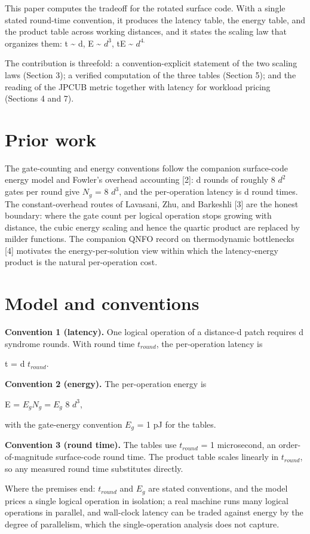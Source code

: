 \documentclass[11pt]{article}
\begin{document}
This paper computes the tradeoff for the rotated surface code. With a single stated round-time convention, it produces the latency table, the energy table, and the product table across working distances, and it states the scaling law that organizes them: t \textasciitilde{} d, E \textasciitilde{} $d^{3}$, tE \textasciitilde{} $d^{4.}$

The contribution is threefold: a convention-explicit statement of the two scaling laws (Section 3); a verified computation of the three tables (Section 5); and the reading of the JPCUB metric together with latency for workload pricing (Sections 4 and 7).

\section{Prior work}
The gate-counting and energy conventions follow the companion surface-code energy model and Fowler's overhead accounting [2]: d rounds of roughly 8 $d^{2}$ gates per round give $N_{g}$ = 8 $d^{3}$, and the per-operation latency is d round times. The constant-overhead routes of Lavasani, Zhu, and Barkeshli [3] are the honest boundary: where the gate count per logical operation stops growing with distance, the cubic energy scaling and hence the quartic product are replaced by milder functions. The companion QNFO record on thermodynamic bottlenecks [4] motivates the energy-per-solution view within which the latency-energy product is the natural per-operation cost.

\section{Model and conventions}
\textbf{Convention 1 (latency).} One logical operation of a distance-d patch requires d syndrome rounds. With round time $t_{round}$, the per-operation latency is

t = d $t_{round}$.

\textbf{Convention 2 (energy).} The per-operation energy is

E = $E_{g}   N_{g} = E_{g}$ 8 $d^{3}$,

with the gate-energy convention $E_{g}$ = 1 pJ for the tables.

\textbf{Convention 3 (round time).} The tables use $t_{round}$ = 1 microsecond, an order-of-magnitude surface-code round time. The product table scales linearly in $t_{round}$, so any measured round time substitutes directly.

Where the premises end: $t_{round}$ and $E_{g}$ are stated conventions, and the model prices a single logical operation in isolation; a real machine runs many logical operations in parallel, and wall-clock latency can be traded against energy by the degree of parallelism, which the single-operation analysis does not capture.
\end{document}
